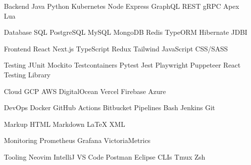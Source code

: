 

\begin{cvskills}

  \cvskill
    {Backend} %
    {Java \cpshalf Python \cpshalf Kubernetes \cpshalf Node \cpshalf Express \cpshalf GraphQL \cpshalf REST \cpshalf gRPC \cpshalf Apex \cpshalf Lua } %

  \cvskill
    {Database} %
    {SQL \cpshalf PostgreSQL \cpshalf MySQL \cpshalf MongoDB \cpshalf Redis \cpshalf TypeORM \cpshalf Hibernate \cpshalf JDBI} %

  \cvskill
    {Frontend} %
    {React \cpshalf Next.js \cpshalf TypeScript \cpshalf Redux \cpshalf Tailwind \cpshalf JavaScript \cpshalf CSS/SASS} %

  \cvskill
    {Testing} %
    {JUnit \cpshalf Mockito \cpshalf Testcontainers \cpshalf Pytest \cpshalf Jest \cpshalf Playwright \cpshalf Puppeteer \cpshalf React Testing Library} %

  \cvskill
    {Cloud} %
    {GCP \cpshalf AWS \cpshalf DigitalOcean \cpshalf Vercel \cpshalf Firebase \cpshalf Azure} %

  \cvskill
    {DevOps} %
    {Docker \cpshalf GitHub Actions \cpshalf Bitbucket Pipelines \cpshalf Bash \cpshalf Jenkins \cpshalf Git} %

  \cvskill
    {Markup} %
    {HTML \cpshalf Markdown \cpshalf LaTeX \cpshalf XML} %

  \cvskill
  {Monitoring} %
    {Prometheus \cpshalf Grafana \cpshalf VictoriaMetrics} %

  \cvskill
  {Tooling} %
    {Neovim \cpshalf IntelliJ \cpshalf VS Code \cpshalf Postman \cpshalf Eclipse \cpshalf CLIs \cpshalf Tmux \cpshalf Zsh} %

\end{cvskills}
